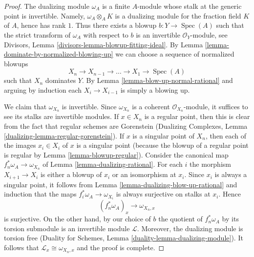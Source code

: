\documentclass[10pt,a4paper]{amsart}
\theoremstyle{plain}
\theoremstyle{definition}
\theoremstyle{remark}
\numberwithin{equation}{subsection}
\def\Spec{\mathop{\mathrm{Spec}}}
\begin{document}
\begin{proof}
The dualizing module $\omega_A$ is a finite $A$-module whose stalk at
the generic point is invertible. Namely, $\omega_A \otimes_A K$
is a dualizing module for the fraction field $K$ of $A$, hence has
rank $1$. Thus there exists a blowup $b : Y \to \Spec(A)$ such that
the strict transform of $\omega_A$ with respect to $b$ is an invertible
$\mathcal{O}_Y$-module, see
Divisors, Lemma \ref{divisors-lemma-blowup-fitting-ideal}.
By Lemma \ref{lemma-dominate-by-normalized-blowing-up}
we can choose a sequence of normalized blowups
$$
X_n \to X_{n - 1} \to \ldots \to X_1 \to \Spec(A)
$$
such that $X_n$ dominates $Y$. By Lemma \ref{lemma-blow-up-normal-rational}
and arguing by induction each $X_i \to X_{i - 1}$ is simply a blowing up.

\medskip\noindent
We claim that $\omega_{X_n}$ is invertible. Since $\omega_{X_n}$
is a coherent $\mathcal{O}_{X_n}$-module, it suffices to see its stalks
are invertible modules. If $x \in X_n$ is a regular point, then this is
clear from the fact that regular schemes are
Gorenstein (Dualizing Complexes, Lemma
\ref{dualizing-lemma-regular-gorenstein}). If $x$ is a singular point of
$X_n$, then each of the images $x_i \in X_i$ of $x$ is a singular point
(because the blowup of a regular point is regular by
Lemma \ref{lemma-blowup-regular}).
Consider the canonical map $f_n^*\omega_A \to \omega_{X_n}$ of
Lemma \ref{lemma-dualizing-rational}. For each $i$ the morphism
$X_{i + 1} \to X_i$ is either a blowup of $x_i$ or an isomorphism
at $x_i$. Since $x_i$ is always a singular point, it follows from
Lemma \ref{lemma-dualizing-blow-up-rational}
and induction that the maps $f_i^*\omega_A \to \omega_{X_i}$
is always surjective on stalks at $x_i$. Hence
$$
(f_n^*\omega_A)_x \longrightarrow \omega_{X_n, x}
$$
is surjective. On the other hand, by our choice of $b$ the quotient
of $f_n^*\omega_A$ by its torsion submodule is an invertible module
$\mathcal{L}$. Moreover, the dualizing module is torsion free
(Duality for Schemes, Lemma \ref{duality-lemma-dualizing-module}).
It follows that $\mathcal{L}_x \cong  \omega_{X_n, x}$ and the proof is
complete.
\end{proof}
\end{document}
